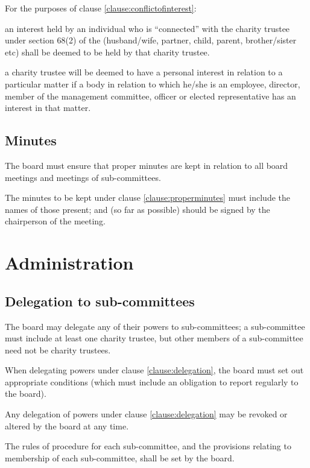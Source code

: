 \documentclass{article}
\begin{document}
\clause For the purposes of clause \ref{clause:conflictofinterest}:

\subclause an interest held by an individual who is ``connected'' with
the charity trustee under section 68(2) of the \charityact
(husband/wife, partner, child, parent, brother/sister etc) shall be
deemed to be held by that charity trustee.

\subclause a charity trustee will be deemed to have a personal
interest in relation to a particular matter if a body in relation to
which he/she is an employee, director, member of the management
committee, officer or elected representative has an interest in that
matter.

\subsection{Minutes}

\clause\label{clause:properminutes}The board must ensure that proper
minutes are kept in relation to all board meetings and meetings of
sub-committees.

\clause The minutes to be kept under clause \ref{clause:properminutes}
must include the names of those present; and (so far as possible)
should be signed by the chairperson of the meeting.

\section{Administration}

\subsection{Delegation to sub-committees}

\clause\label{clause:delegation}The board may delegate any of their
powers to sub-committees; a sub-committee must include at least one
charity trustee, but other members of a sub-committee need not be
charity trustees.

\clause When delegating powers under clause \ref{clause:delegation},
the board must set out appropriate conditions (which must include an
obligation to report regularly to the board).

\clause Any delegation of powers under clause \ref{clause:delegation}
may be revoked or altered by the board at any time.

\clause The rules of procedure for each sub-committee, and the
provisions relating to membership of each sub-committee, shall be set
by the board.
\end{document}
